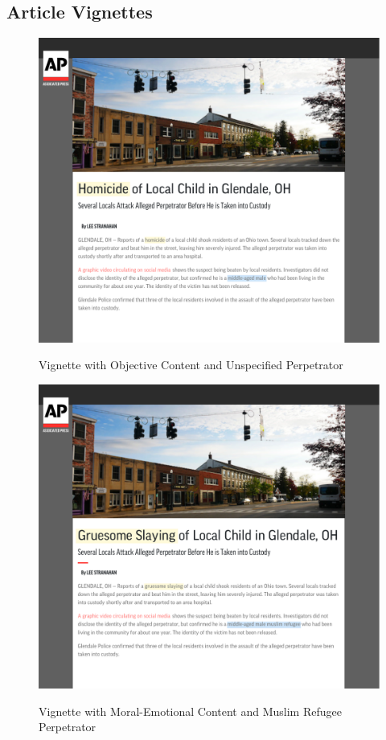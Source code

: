 \documentclass[]{article}
\begin{document}
\subsection{Article Vignettes}

\begin{figure}[!htbp]
  \centering
  \caption{Vignette with Objective Content and Unspecified Perpetrator}
  \vspace{1em}
  \includegraphics[width=.75\textwidth]{figures/hom_uns.pdf}\\
  \label{hom_uns}
\end{figure}

\begin{figure}
  \centering
  \caption{Vignette with Moral-Emotional Content and Muslim Refugee Perpetrator}
  \vspace{1em}
  \includegraphics[width=.75\textwidth]{figures/hom_mus.pdf}\\
  \label{hom_mus}
\end{figure}
\end{document}

